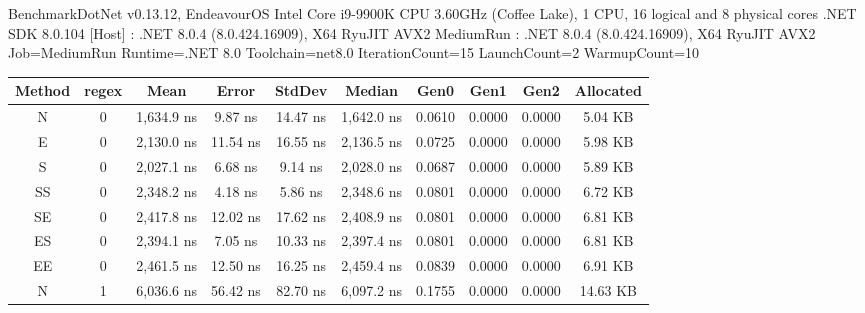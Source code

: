 BenchmarkDotNet v0.13.12, EndeavourOS
Intel Core i9-9900K CPU 3.60GHz (Coffee Lake), 1 CPU, 16 logical and 8 physical cores
.NET SDK 8.0.104
  [Host]    : .NET 8.0.4 (8.0.424.16909), X64 RyuJIT AVX2
  MediumRun : .NET 8.0.4 (8.0.424.16909), X64 RyuJIT AVX2
Job=MediumRun  Runtime=.NET 8.0  Toolchain=net8.0  
IterationCount=15  LaunchCount=2  WarmupCount=10  

\begin{sidewaystable}
    \begin{tabular}{|c|c|c|c|c|c|c|c|c|c|}
        \hline
        Method  &   regex   &   Mean                  &   Error             &   StdDev                &   Median                &   Gen0        &   Gen1        &   Gen2        &   Allocated        \\
        \hline
        N       &   0       &   1,634.9 ns            &   9.87 ns           &   14.47 ns              &   1,642.0 ns            &   0.0610      &   0.0000      &   0.0000      &   5.04 KB          \\
        E       &   0       &   2,130.0 ns            &   11.54 ns          &   16.55 ns              &   2,136.5 ns            &   0.0725      &   0.0000      &   0.0000      &   5.98 KB          \\
        S       &   0       &   2,027.1 ns            &   6.68 ns           &   9.14 ns               &   2,028.0 ns            &   0.0687      &   0.0000      &   0.0000      &   5.89 KB          \\
        SS      &   0       &   2,348.2 ns            &   4.18 ns           &   5.86 ns               &   2,348.6 ns            &   0.0801      &   0.0000      &   0.0000      &   6.72 KB          \\
        SE      &   0       &   2,417.8 ns            &   12.02 ns          &   17.62 ns              &   2,408.9 ns            &   0.0801      &   0.0000      &   0.0000      &   6.81 KB          \\
        ES      &   0       &   2,394.1 ns            &   7.05 ns           &   10.33 ns              &   2,397.4 ns            &   0.0801      &   0.0000      &   0.0000      &   6.81 KB          \\
        EE      &   0       &   2,461.5 ns            &   12.50 ns          &   16.25 ns              &   2,459.4 ns            &   0.0839      &   0.0000      &   0.0000      &   6.91 KB          \\
        N       &   1       &   6,036.6 ns            &   56.42 ns          &   82.70 ns              &   6,097.2 ns            &   0.1755      &   0.0000      &   0.0000      &   14.63 KB         \\

\end{tabular}
\end{sidewaystable}
